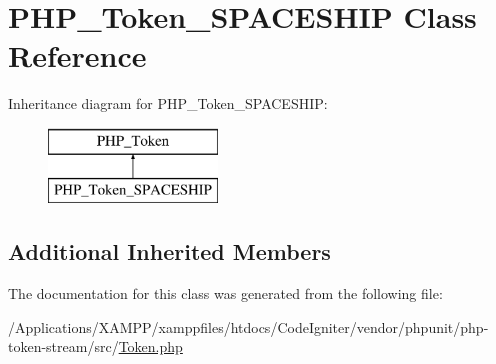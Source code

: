 \hypertarget{class_p_h_p___token___s_p_a_c_e_s_h_i_p}{}\section{P\+H\+P\+\_\+\+Token\+\_\+\+S\+P\+A\+C\+E\+S\+H\+IP Class Reference}
\label{class_p_h_p___token___s_p_a_c_e_s_h_i_p}
Inheritance diagram for P\+H\+P\+\_\+\+Token\+\_\+\+S\+P\+A\+C\+E\+S\+H\+IP\+:\begin{figure}[H]
\begin{center}
\leavevmode
\includegraphics[height=2.000000cm]{class_p_h_p___token___s_p_a_c_e_s_h_i_p}
\end{center}
\end{figure}
\subsection*{Additional Inherited Members}


The documentation for this class was generated from the following file\+:\begin{DoxyCompactItemize}
\item 
/\+Applications/\+X\+A\+M\+P\+P/xamppfiles/htdocs/\+Code\+Igniter/vendor/phpunit/php-\/token-\/stream/src/\mbox{\hyperlink{_token_8php}{Token.\+php}}\end{DoxyCompactItemize}

